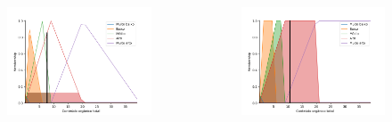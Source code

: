 \documentclass[aspectratio=169]{beamer} %
\begin{document}
{{{{{{{{{\begin{frame}
\begin{flushright}
\begin{columns}
        \centering
         \begin{figure}
		\centering
		\includegraphics[scale=0.4]{images/COT_Kivu_triangular.png}
	\end{figure}
	     	
        \centering
         \begin{figure}
		\centering
		\includegraphics[scale=0.4]{images/COT_Kivu_trapezoidal.png}
	\end{figure}
    \end{columns}

\end{flushright}

\end{frame} }


}}}}}}}}
\end{document}
